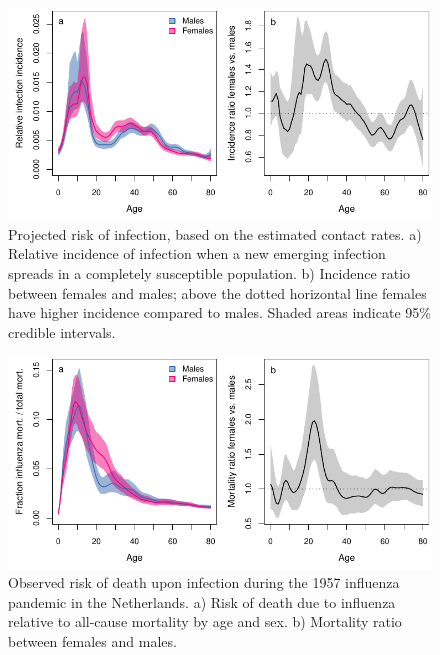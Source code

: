 \documentclass[aoas,preprint]{imsart}
\numberwithin{equation}{section}
\begin{document}
\begin{figure}
\centering
\includegraphics{fig_relative_infection_incidence.pdf}
\caption{Projected risk of infection, based on the estimated contact rates. a) Relative incidence of infection when a new emerging infection spreads in a completely susceptible population. b) Incidence ratio between females and males; above the dotted horizontal line females have higher incidence compared to males. Shaded areas indicate 95\% credible intervals.} \label{fig:6}
\end{figure}

\begin{figure}
\centering
\includegraphics{fig_influenza_mortality.pdf}
\caption{Observed risk of death upon infection during the 1957 influenza pandemic in the Netherlands. a) Risk of death due to influenza relative to all-cause mortality by age and sex. b) Mortality ratio between females and males.} \label{fig:7}
\end{figure}
\end{document}
